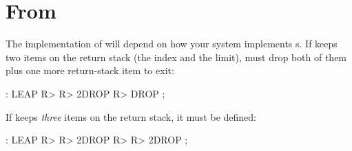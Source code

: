 \section{From }

The implementation of  will depend on how
your system implements  s.  If  keeps two
items on the return stack (the index and the limit), 
must drop both of them plus one more return-stack item to exit:
\begin{Code}
: LEAP   R> R> 2DROP  R> DROP ;
\end{Code}
If  keeps \emph{three} items on the return stack, it must be defined: 
\begin{Code}
: LEAP   R> R> 2DROP  R> R> 2DROP ;
\end{Code}

